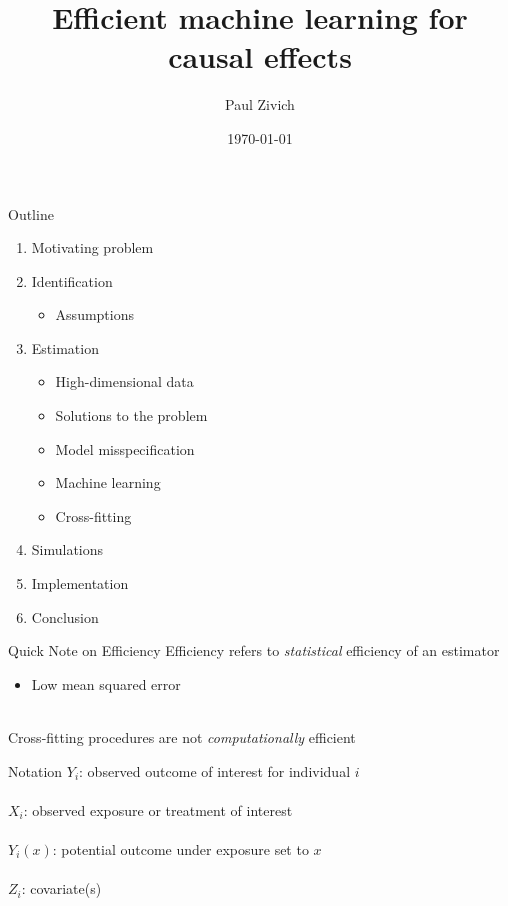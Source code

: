 \documentclass{beamer}
\title{Efficient machine learning for causal effects}
\author{Paul Zivich}
\institute{University of North Carolina at Chapel Hill}
\date{\today}
\begin{document}
\begin{frame}[plain]
    \maketitle
\end{frame}

\begin{frame}{Outline}
	\begin{enumerate}
		\item Motivating problem
		\item Identification
		\begin{itemize}
			\item Assumptions
		\end{itemize}
		\item Estimation
		\begin{itemize}
			\item High-dimensional data
			\item Solutions to the problem
			\item Model misspecification
			\item Machine learning
			\item Cross-fitting
		\end{itemize}
		\item Simulations
		\item Implementation
		\item Conclusion
	\end{enumerate}
\end{frame}

\begin{frame}{Quick Note on Efficiency}
	Efficiency refers to \textit{statistical} efficiency of an estimator
	\begin{itemize}
		\item Low mean squared error
	\end{itemize}~\\
	Cross-fitting procedures are not \textit{computationally} efficient
\end{frame}

\begin{frame}{Notation}
	$Y_i$: observed outcome of interest for individual $i$\\~\\
	$X_i$: observed exposure or treatment of interest\\~\\
	$Y_i(x)$: potential outcome under exposure set to $x$\\~\\
	$Z_i$: covariate(s)\\~\\
\end{frame}
\end{document}
